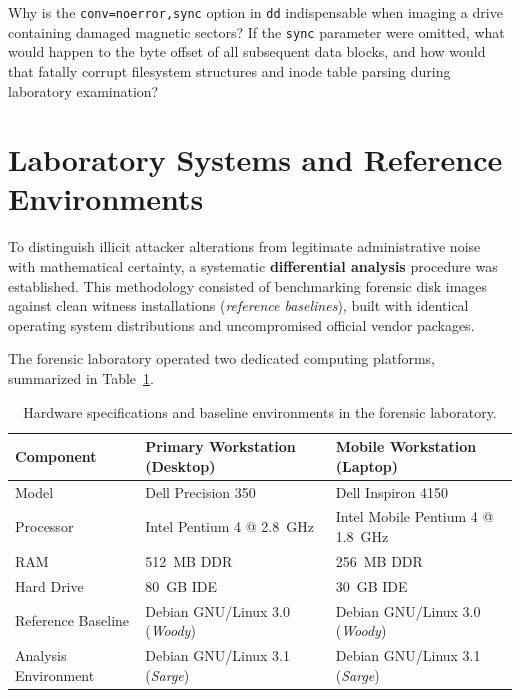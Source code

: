 \begin{retoforense}
Why is the \texttt{conv=noerror,sync} option in \texttt{dd} indispensable when imaging a drive containing damaged magnetic sectors? If the \texttt{sync} parameter were omitted, what would happen to the byte offset of all subsequent data blocks, and how would that fatally corrupt filesystem structures and inode table parsing during laboratory examination?
\end{retoforense}

\section{Laboratory Systems and Reference Environments}

To distinguish illicit attacker alterations from legitimate administrative noise with mathematical certainty, a systematic \textbf{differential analysis} procedure was established. This methodology consisted of benchmarking forensic disk images against clean witness installations (\textit{reference baselines}), built with identical operating system distributions and uncompromised official vendor packages.

The forensic laboratory operated two dedicated computing platforms, summarized in Table~\ref{tab:sistemas_laboratorio}.

\begin{table}[htbp]
\centering
\small
\begin{tabularx}{\textwidth}{@{} l X X @{}}
\toprule
\textbf{Component} & \textbf{Primary Workstation (Desktop)} & \textbf{Mobile Workstation (Laptop)} \\
\midrule
Model & Dell Precision 350 & Dell Inspiron 4150 \\
Processor & Intel Pentium 4 @ 2.8~GHz & Intel Mobile Pentium 4 @ 1.8~GHz \\
RAM & 512~MB DDR & 256~MB DDR \\
Hard Drive & 80~GB IDE & 30~GB IDE \\
Reference Baseline & Debian GNU/Linux 3.0 (\textit{Woody}) & Debian GNU/Linux 3.0 (\textit{Woody}) \\
Analysis Environment & Debian GNU/Linux 3.1 (\textit{Sarge}) & Debian GNU/Linux 3.1 (\textit{Sarge}) \\
\bottomrule
\end{tabularx}
\caption{Hardware specifications and baseline environments in the forensic laboratory.}
\label{tab:sistemas_laboratorio}
\end{table}


